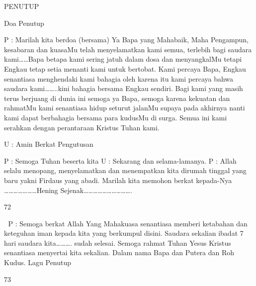 PENUTUP 

Doa Penutup 

P : Marilah kita berdoa (bersama) 
Ya Bapa yang Mahabaik, Maha Pengampun, kesabaran dan 
kuasaMu telah menyelamatkan kami semua, terlebih bagi 
saudara kami……Bapa betapa kami sering jatuh dalam dosa 
dan menyangkalMu tetapi Engkau tetap setia menanti kami 
untuk bertobat. Kami percaya Bapa, Engkau senantiasa 
menghendaki kami bahagia oleh karena itu kami percaya 
bahwa saudara kami……..kini bahagia bersama Engkau 
sendiri. Bagi kami yang masih terus berjuang di dunia ini 
semoga ya Bapa, semoga karena kekuatan dan rahmatMu 
kami senantiasa hidup seturut jalanMu supaya pada akhirnya 
nanti kami dapat berbahagia bersama para kudusMu di surga. 
Semua ini kami serahkan dengan perantaraan Kristus Tuhan 
kami. 

U : Amin 
Berkat Pengutusan 

P : Semoga Tuhan beserta kita 
U : Sekarang dan selama-lamanya. 
P : Allah selalu menopang, menyelamatkan dan menempatkan 
kita dirumah tinggal yang baru yakni Firdaus yang abadi. 
Marilah kita memohon berkat kepada-Nya 
…………………Hening Sejenak…………………………. 

72 



P 
: Semoga berkat Allah Yang Mahakuasa senantiasa 
memberi ketabahan dan keteguhan iman kepada kita yang 
berkumpul disini. Saudara sekalian ibadat 7 hari saudara 
kita………. sudah selesai. Semoga rahmat Tuhan Yesus 
Kristus senantiasa menyertai kita sekalian. Dalam nama 
Bapa dan Putera dan Roh Kudus. 
Lagu Penutup 

73 


